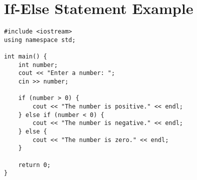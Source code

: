 \documentclass[12pt]{article}
\begin{document}
\section*{If-Else Statement Example}
\begin{verbatim}
#include <iostream>
using namespace std;

int main() {
    int number;
    cout << "Enter a number: ";
    cin >> number;

    if (number > 0) {
        cout << "The number is positive." << endl;
    } else if (number < 0) {
        cout << "The number is negative." << endl;
    } else {
        cout << "The number is zero." << endl;
    }

    return 0;
}
\end{verbatim}
\end{document}
